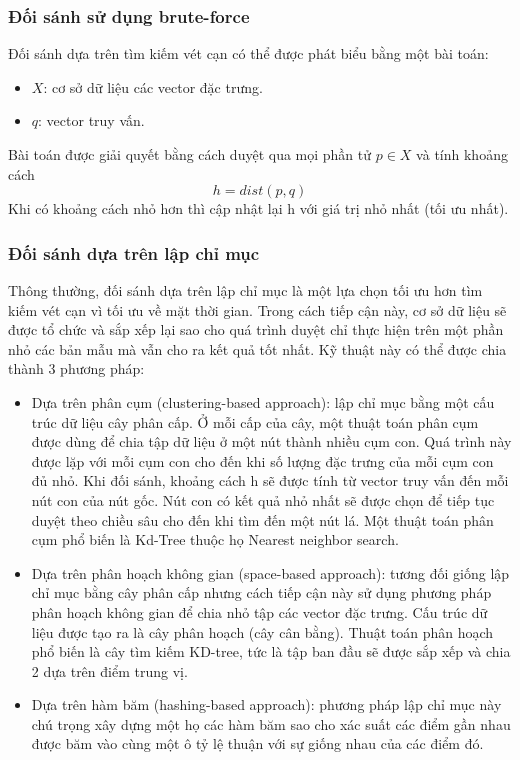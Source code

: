 \subsubsection{Đối sánh sử dụng brute-force}
Đối sánh dựa trên tìm kiếm vét cạn có thể được phát biểu bằng một bài toán:
\begin{itemize}
	\item $X$: cơ sở dữ liệu các vector đặc trưng.
	\item $q$: vector truy vấn.
\end{itemize}
Bài toán được giải quyết bằng cách duyệt qua mọi phần tử $p \in X$ và tính khoảng cách 
\[ h = dist(p, q) \]
 Khi có khoảng cách nhỏ hơn thì cập nhật lại h với giá trị nhỏ nhất (tối ưu nhất).
 
\subsubsection{Đối sánh dựa trên lập chỉ mục}
Thông thường, đối sánh dựa trên lập chỉ mục là một lựa chọn tối ưu hơn tìm kiếm vét cạn vì tối ưu về mặt thời gian. Trong cách tiếp cận này, cơ sở dữ liệu sẽ được tổ chức và sắp xếp lại sao cho quá trình duyệt chỉ thực hiện trên một phần nhỏ các bản mẫu mà vẫn cho ra kết quả tốt nhất. Kỹ thuật này có thể được chia thành 3 phương pháp:
\begin{itemize}
	\item Dựa trên phân cụm (clustering-based approach): lập chỉ mục bằng một cấu trúc dữ liệu cây phân cấp. Ở mỗi cấp của cây, một thuật toán phân cụm được dùng để chia tập dữ liệu ở một nút thành nhiều cụm con. Quá trình này được lặp với mỗi cụm con cho đến khi số lượng đặc trưng của mỗi cụm con đủ nhỏ. Khi đối sánh, khoảng cách h sẽ được tính từ vector truy vấn đến mỗi nút con của nút gốc. Nút con có kết quả nhỏ nhất sẽ được chọn để tiếp tục duyệt theo chiều sâu cho đến khi tìm đến một nút lá. Một thuật toán phân cụm phổ biến là Kd-Tree thuộc họ Nearest neighbor search.
	\item Dựa trên phân hoạch không gian (space-based approach): tương đối giống lập chỉ mục bằng cây phân cấp nhưng cách tiếp cận này sử dụng phương pháp phân hoạch không gian để chia nhỏ tập các vector đặc trưng. Cấu trúc dữ liệu được tạo ra là cây phân hoạch (cây cân bằng). Thuật toán phân hoạch phổ biến là cây tìm kiếm KD-tree, tức là tập ban đầu sẽ được sắp xếp và chia 2 dựa trên điểm trung vị.
	\item Dựa trên hàm băm (hashing-based approach): phương pháp lập chỉ mục này chú trọng xây dựng một họ các hàm băm sao cho xác suất các điểm gần nhau được băm vào cùng một ô tỷ lệ thuận với sự giống nhau của các điểm đó.
\end{itemize}
